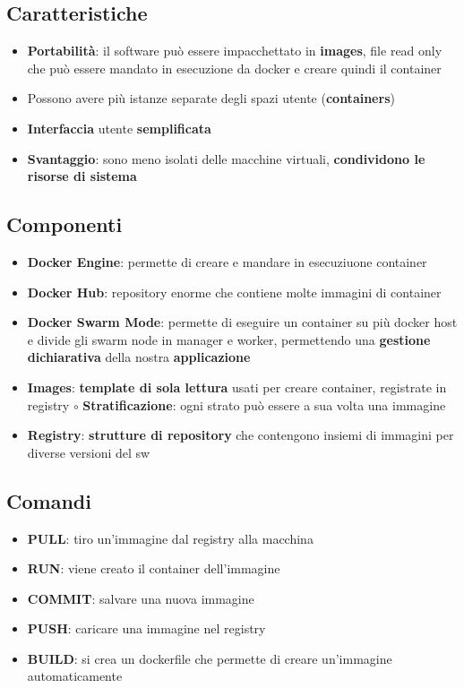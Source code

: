 \documentclass[a4paper, 12pt]{report}
\begin{document}
    \subsection{Caratteristiche}
    \begin{itemize}
      \item \textbf{Portabilità}: il software può essere impacchettato in \textbf{images}, file read only che può essere mandato in esecuzione da docker e creare quindi il container
      \item Possono avere più istanze separate degli spazi utente (\textbf{containers})
      \item \textbf{Interfaccia} utente \textbf{semplificata}
      \item \textbf{Svantaggio}: sono meno isolati delle macchine virtuali, \textbf{condividono le risorse di sistema}
    \end{itemize}
    \subsection{Componenti}
    \begin{itemize}
      \item \textbf{Docker Engine}: permette di creare e mandare in esecuziuone container
      \item \textbf{Docker Hub}: repository enorme che contiene molte immagini di container
      \item \textbf{Docker Swarm Mode}: permette di eseguire un container su più docker host e divide gli swarm node in manager e worker, permettendo una \textbf{gestione dichiarativa} della nostra \textbf{applicazione}
      \item \textbf{Images}: \textbf{template di sola lettura} usati per creare container, registrate in registry
      \subitem $\circ$ \textbf{Stratificazione}: ogni strato può essere a sua volta una immagine 
      \item \textbf{Registry}: \textbf{strutture di repository} che contengono insiemi di immagini per diverse versioni del sw
    \end{itemize}
    \subsection{Comandi}
    \begin{itemize}
      \item \textbf{PULL}: tiro un'immagine dal registry alla macchina
      \item \textbf{RUN}: viene creato il container dell'immagine
      \item \textbf{COMMIT}: salvare una nuova immagine
      \item \textbf{PUSH}: caricare una immagine nel registry
      \item \textbf{BUILD}: si crea un dockerfile che permette di creare un'immagine automaticamente
    \end{itemize}
\end{document}
